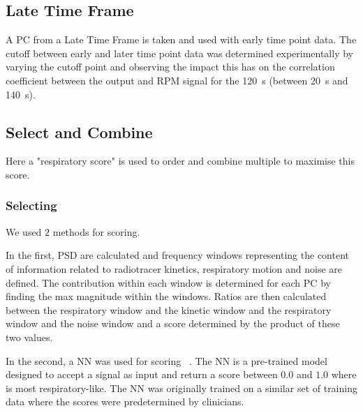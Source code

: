    \vspace{-0.3cm}
            
    \subsection{Late Time Frame} \label{sec:late_time_frame}
        A \gls{PC} from a Late Time Frame is taken and used with early time point data. The cutoff between early and later time point data was determined experimentally by varying the cutoff point and observing the impact this has on the correlation coefficient between the output and \gls{RPM} signal for the \SI{120}{\second} (between \SI{20}{\second} and \SI{140}{\second}).
        
    \vspace{-0.3cm}
    
    \subsection{Select and Combine} \label{sec:select_and_combine}
        Here a "respiratory score" is used to order and combine multiple  to maximise this score.
        
        \subsubsection{Selecting } \label{sec:selecting_pcs}
              We used $2$ methods for scoring.
              
              In the first, \acrlong{PSD} are calculated and frequency windows representing the content of information related to radiotracer kinetics, respiratory motion and noise are defined. The contribution within each window is determined for each \gls{PC} by finding the max magnitude within the windows. Ratios are then calculated between the respiratory window and the kinetic window and the respiratory window and the noise window and a score determined by the product of these two values.
        
        
            In the second, a \gls{NN} was used for scoring ~\cite{Walker2020AutomaticAI}. The \gls{NN} is a pre-trained model designed to accept a signal as input and return a score between $0.0$ and $1.0$ where is most respiratory-like. The \gls{NN} was originally trained on a similar set of training data where the scores were predetermined by clinicians.
        
